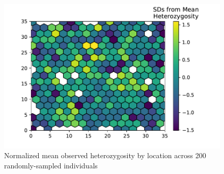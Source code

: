 \documentclass[9pt,twocolumn,twoside,lineno]{gsajnl}
\begin{document}
\afterpage{\clearpage}
\begin{figure}[p]
\centering
\includegraphics[]{het_z_by_ind.pdf}
\caption{Normalized mean observed heterozygosity by location across 200 randomly-sampled individuals}
\label{fig:spectrum}
\end{figure}

\end{document}
